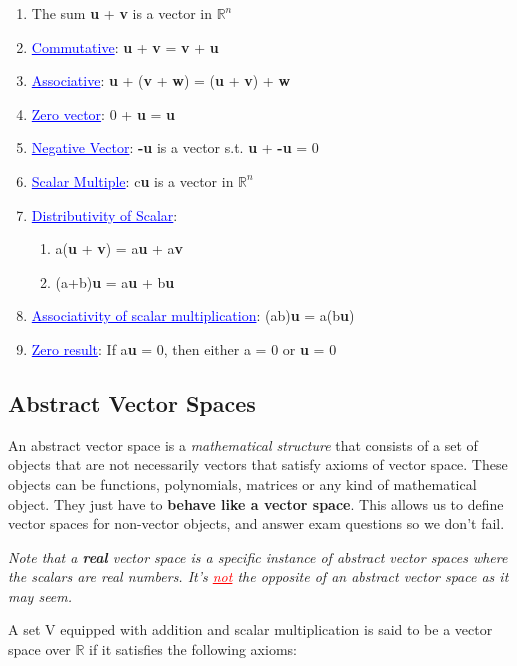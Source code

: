 \documentclass{article}
\newcommand{\bul}[1]{\textcolor{blue}{\underline{#1}}}
\newcommand{\rul}[1]{\textcolor{red}{\underline{#1}}}
\newcommand{\sbreak}{\vspace{10pt}}
\begin{document}
\begin{enumerate}
    \item The sum \textbf{u} + \textbf{v} is a vector in $\mathbb{R}^n$
    \item \bul{Commutative}: \textbf{u} + \textbf{v} = \textbf{v} + \textbf{u}
    \item \bul{Associative}: \textbf{u} + (\textbf{v} + \textbf{w}) = (\textbf{u} + \textbf{v}) + \textbf{w}
    \item \bul{Zero vector}: 0 + \textbf{u} = \textbf{u}
    \item \bul{Negative Vector}: \textbf{-u} is a vector s.t. \textbf{u} + \textbf{-u} = 0
    \item \bul{Scalar Multiple}: c\textbf{u} is a vector in $\mathbb{R}^n$
    \item \bul{Distributivity of Scalar}:
    \begin{enumerate}
        \item a(\textbf{u} + \textbf{v}) = a\textbf{u} + a\textbf{v}
        \item (a+b)\textbf{u} = a\textbf{u} + b\textbf{u}
    \end{enumerate}
    \item \bul{Associativity of scalar multiplication}: (ab)\textbf{u} = a(b\textbf{u})
    \item \bul{Zero result}: If a\textbf{u} = 0, then either a = 0 or \textbf{u} = 0
\end{enumerate}

\subsection{Abstract Vector Spaces}
An abstract vector space is a \textit{mathematical structure} that consists of a set of objects that are not necessarily vectors that satisfy axioms of vector space. These objects can be functions, polynomials, matrices or any kind of mathematical object. They just have to \textbf{behave like a vector space}. This allows us to define vector spaces for non-vector objects, and answer exam questions so we don't fail.

\textit{Note that a \textbf{real} vector space is a specific instance of abstract vector spaces where the scalars are real numbers. It's \rul{not} the opposite of an abstract vector space as it may seem.}

\sbreak

A set V equipped with addition and scalar multiplication is said to be a vector space over $\mathbb{R}$ if it satisfies the following axioms:
\end{document}
